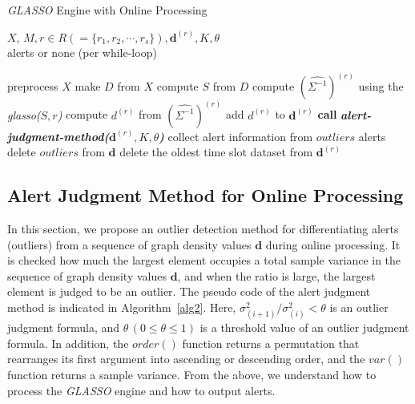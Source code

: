 \documentclass[conference]{IEEEtran}
\begin{document}
\begin{algorithm}[tb]
\caption{\textit{GLASSO} Engine with Online Processing}
\label{alg1}
\begin{algorithmic}[1]
  \REQUIRE $X$, $M, r \in R ( = \{r_1, r_2, \cdots, r_s\} ), \bm{d}^{(r)}, K, \theta$\\
  \ENSURE alerts or none (per while-loop)

    \STATE preprocess $X$
    \STATE make $D$ from $X$
    \STATE compute $S$ from $D$
      \STATE compute ${(\hat{\Sigma^{-1}})}^{(r)}$ using the \textit{glasso($S,r$)}
      \STATE compute $d^{(r)}$ from ${(\hat{\Sigma^{-1}})}^{(r)}$
      \STATE add $d^{(r)}$ to $\bm{d}^{(r)}$
        \STATE \textbf{call} \textit{\textbf{alert-judgment-method($\bm{d}^{(r)}, K, \theta$)}}
          \STATE collect alert information from $outliers$
          \RETURN alerts
          \STATE delete $outliers$ from $\bm{d}$
        \ELSE
          \STATE delete the oldest time slot dataset from $\bm{d}^{(r)}$
        \ENDIF
  		\ENDIF
  	\ENDFOR
  \ENDWHILE
\end{algorithmic}
\end{algorithm}





\subsection{Alert Judgment Method for Online Processing}
In this section, we propose an outlier detection method for differentiating alerts (outliers) from a sequence of graph density values $\bm{d}$ during online processing.
It is checked how much the largest element occupies a total sample variance in the sequence of graph density values $\bm{d}$, and when the ratio is large, the largest element is judged to be an outlier.
The pseudo code of the alert judgment method is indicated in Algorithm~\ref{alg2}.
Here, $\sigma^{2}_{(i+1)}/\sigma^{2}_{(i)}<\theta$ is an outlier judgment formula, and $\theta \, (0\leq \theta \leq 1)$ is a threshold value of an outlier judgment formula.
In addition, the $order()$ function returns a permutation that rearranges its first argument into ascending or descending order, and the $var()$ function returns a sample variance.
From the above, we understand how to process the \textit{GLASSO} engine and how to output alerts.
\end{document}
